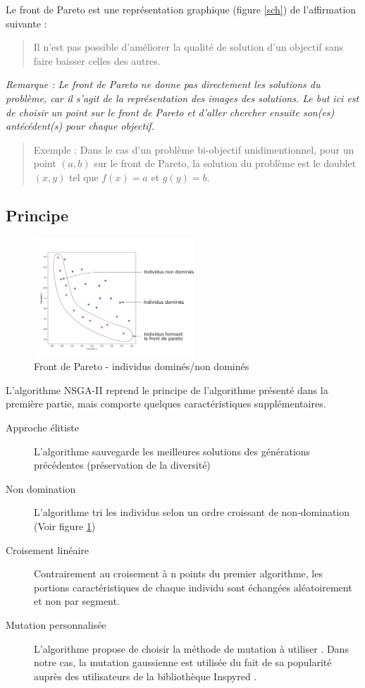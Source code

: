 \documentclass[12pt]{report}
\begin{document}
    Le front de Pareto est une représentation graphique (figure \ref{sch}) de l'affirmation suivante :
    \begin{quotation}
      Il n'est pas possible d'améliorer la qualité de solution d'un objectif sans faire baisser celles des autres.
    \end{quotation}

    \emph{Remarque : Le front de Pareto ne donne pas directement les solutions du problème, car il s'agit de la représentation des images des solutions. Le but ici est de choisir un point sur le front de Pareto et d'aller chercher ensuite son(es) antécédent(s) pour chaque objectif.}

    \begin{quotation}
      Exemple : Dans le cas d'un problème bi-objectif unidimentionnel, pour un point $(a,b)$ sur le front de Pareto, la solution du problème est le doublet $(x,y)$ tel que $f(x)=a$ et $g(y)=b$.
    \end{quotation}



      \subsection{Principe}
      \begin{figure}
        \centering
        \includegraphics[width=6cm]{img/Pareto_domine.png}
        \caption{Front de Pareto - individus dominés/non dominés}
        \label{non_domine}
      \end{figure}
      L'algorithme NSGA-II reprend le principe de l'algorithme présenté dans la première partie, mais comporte quelques caractéristiques supplémentaires.


      \begin{description}
        \item [Approche élitiste] L'algorithme sauvegarde les meilleures solutions des générations précédentes (préservation de la diversité)
        \item [Non domination] L'algorithme tri les individus selon un ordre croissant de non-domination (Voir figure \ref{non_domine})
        \item [Croisement linéaire] Contrairement au croisement à n points du premier algorithme, les portions caractéristiques de chaque individu sont échangées aléatoirement et non par segment.
        \item [Mutation personnalisée] L'algorithme propose de choisir la méthode de mutation à utiliser \cite{wiki6}. Dans notre cas, la mutation gaussienne est utilisée du fait de sa popularité auprès des utilisateurs de la bibliothèque Inspyred \cite{inspyred}.
      \end{description}
\end{document}
